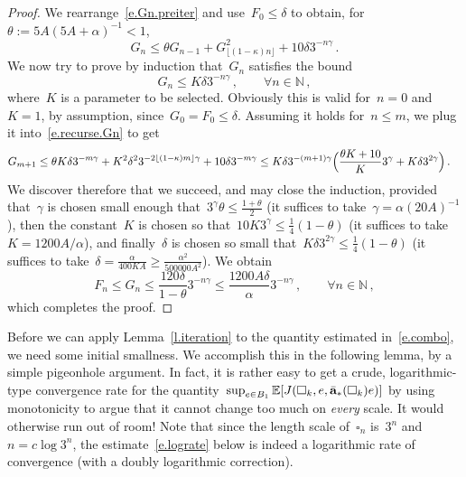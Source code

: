 \documentclass[11pt,twoside]{article} %
\let\oldsquare\square %
\renewcommand{\square}{\oldsquare}
\numberwithin{equation}{section}
\theoremstyle{definition}
\let\originalleft\left
\let\originalright\right
\renewcommand{\left}{\mathopen{}\mathclose\bgroup\originalleft}
\renewcommand{\right}{\aftergroup\egroup\originalright}
\newcommand*{\N}{\ensuremath{\mathbb{N}}}
\renewcommand{\a}{\mathbf{a}}
\newcommand{\ahom}{\bar{\a}}
\newcommand{\cu}{\square}
\newcommand{\E}{\mathbb{E}}
\begin{document}
\begin{proof}
\smallskip

We rearrange~\eqref{e.Gn.preiter} and use~$F_0 \leq \delta$ to obtain, for~$\theta := 5A (5A+\alpha)^{-1} < 1$,
\begin{equation}
\label{e.recurse.Gn}
G_n \leq 
\theta  G_{n-1} 
+
G_{\lfloor (1-\kappa) n \rfloor}^2 
+
10 \delta 3^{-n\gamma}\,.
\end{equation}
We now try to prove by induction that~$G_n$ satisfies the bound
\begin{equation*}
G_n \leq K \delta 3^{-n\gamma}\,, \qquad \forall n\in\N\,,
\end{equation*}	
where~$K$ is a parameter to be selected. Obviously this is valid for~$n =0$ and~$K=1$, by assumption, since~$G_0 = F_0 \leq \delta$. 
Assuming it holds for~$n \leq m$, we plug it into~\eqref{e.recurse.Gn} to get
\begin{align*}
G_{m+1} 
&
\leq 
\theta K \delta 3^{-m\gamma}
+
K^2 \delta^2 3^{-2 \lfloor (1-\kappa) m \rfloor \gamma}
+
10 \delta 3^{-m\gamma}
\leq
K\delta 3^{-(m+1) \gamma}
\Bigl( 
\frac{\theta K + 10}{K} 3^\gamma
+
K\delta 3^{2\gamma}
\Bigr)
\,.
\end{align*}
We discover therefore that we succeed, and may close the induction, provided that~$\gamma$ is chosen small enough that~$3^\gamma \theta \leq \frac{1+\theta}{2}$ (it suffices to take~$\gamma = \alpha(20A)^{-1}$), then the constant~$K$ is chosen so that~${10}{K} 3^\gamma \leq \frac14(1-\theta)$ (it suffices to take~$K=1200A/\alpha$), and finally~$\delta$ is chosen so small that~$K\delta 3^{2\gamma} \leq \frac14(1-\theta)$ (it suffices to take~$\delta = \frac{\alpha}{400KA}\geq \frac{\alpha^2}{500000 A^2}$). We obtain 
\begin{equation*}
F_n \leq G_n \leq \frac{120\delta}{1-\theta} 3^{-n\gamma}
\leq 
\frac{1200A\delta}{\alpha} 3^{-n\gamma}
\,, \qquad \forall n\in\N\,,
\end{equation*}
which completes the proof. 
\end{proof}



Before we can apply Lemma~\ref{l.iteration} to the quantity estimated in~\eqref{e.combo}, we need some initial smallness. 
We accomplish this in the following lemma, by a simple pigeonhole argument. In fact, it is rather easy to get a crude, logarithmic-type convergence rate for the quantity~$\sup_{e\in B_1 }\E \left[ J(\cu_k,e,\ahom_*(\cu_k) e) \right]$ by using monotonicity to argue that it cannot change too much on \emph{every} scale. It would otherwise run out of room! Note that since the length scale of~$\cu_n$ is~$3^n$ and~$n = c\log 3^n$, the estimate~\eqref{e.lograte} below is indeed a logarithmic rate of convergence (with a doubly logarithmic correction). 
\end{document}
